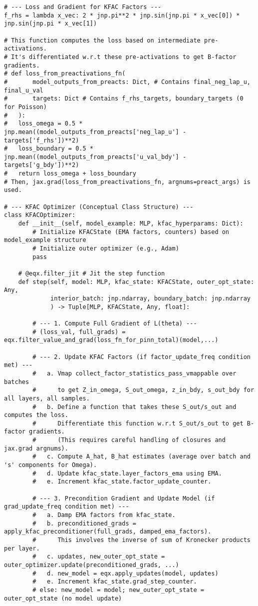 \documentclass[12pt,a4paper]{article}
\begin{document}
\begin{lstlisting}[caption={Further conceptual details for KFAC in JAX + Equinox.},label=lst:kfac_jax_conceptual]
# --- Loss and Gradient for KFAC Factors ---
f_rhs = lambda x_vec: 2 * jnp.pi**2 * jnp.sin(jnp.pi * x_vec[0]) * jnp.sin(jnp.pi * x_vec[1])

# This function computes the loss based on intermediate pre-activations.
# It's differentiated w.r.t these pre-activations to get B-factor gradients.
# def loss_from_preactivations_fn(
#       model_outputs_from_preacts: Dict, # Contains final_neg_lap_u, final_u_val
#       targets: Dict # Contains f_rhs_targets, boundary_targets (0 for Poisson)
#   ):
#   loss_omega = 0.5 * jnp.mean((model_outputs_from_preacts['neg_lap_u'] - targets['f_rhs'])**2)
#   loss_boundary = 0.5 * jnp.mean((model_outputs_from_preacts['u_val_bdy'] - targets['g_bdy'])**2)
#   return loss_omega + loss_boundary
# Then, jax.grad(loss_from_preactivations_fn, argnums=preact_args) is used.

# --- KFAC Optimizer (Conceptual Class Structure) ---
class KFACOptimizer:
    def __init__(self, model_example: MLP, kfac_hyperparams: Dict):
        # Initialize KFACState (EMA factors, counters) based on model_example structure
        # Initialize outer optimizer (e.g., Adam)
        pass

    # @eqx.filter_jit # Jit the step function
    def step(self, model: MLP, kfac_state: KFACState, outer_opt_state: Any,
             interior_batch: jnp.ndarray, boundary_batch: jnp.ndarray
             ) -> Tuple[MLP, KFACState, Any, float]:
        
        # --- 1. Compute Full Gradient of L(theta) ---
        # (loss_val, full_grads) = eqx.filter_value_and_grad(loss_fn_for_pinn_total)(model,...)
        
        # --- 2. Update KFAC Factors (if factor_update_freq condition met) ---
        #   a. Vmap collect_factor_statistics_pass_vmappable over batches
        #      to get Z_in_omega, S_out_omega, z_in_bdy, s_out_bdy for all layers, all samples.
        #   b. Define a function that takes these S_out/s_out and computes the loss.
        #      Differentiate this function w.r.t S_out/s_out to get B-factor gradients.
        #      (This requires careful handling of closures and jax.grad argnums).
        #   c. Compute A_hat, B_hat estimates (average over batch and 's' components for Omega).
        #   d. Update kfac_state.layer_factors_ema using EMA.
        #   e. Increment kfac_state.factor_update_counter.

        # --- 3. Precondition Gradient and Update Model (if grad_update_freq condition met) ---
        #   a. Damp EMA factors from kfac_state.
        #   b. preconditioned_grads = apply_kfac_preconditioner(full_grads, damped_ema_factors).
        #      This involves the inverse of sum of Kronecker products per layer.
        #   c. updates, new_outer_opt_state = outer_optimizer.update(preconditioned_grads, ...)
        #   d. new_model = eqx.apply_updates(model, updates)
        #   e. Increment kfac_state.grad_step_counter.
        # else: new_model = model; new_outer_opt_state = outer_opt_state (no model update)
        

\end{lstlisting}
\end{document}
